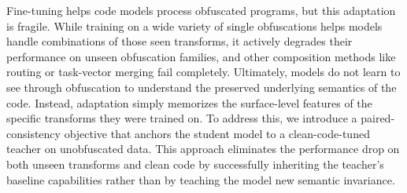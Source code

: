 Fine-tuning helps code models process obfuscated programs, but this adaptation is fragile. While training on a wide variety of single obfuscations helps models handle combinations of those seen transforms, it actively degrades their performance on unseen obfuscation families, and other composition methods like routing or task-vector merging fail completely. Ultimately, models do not learn to see through obfuscation to understand the preserved underlying semantics of the code. Instead, adaptation simply memorizes the surface-level features of the specific transforms they were trained on. To address this, we introduce a paired-consistency objective that anchors the student model to a clean-code-tuned teacher on unobfuscated data. This approach eliminates the performance drop on both unseen transforms and clean code by successfully inheriting the teacher's baseline capabilities rather than by teaching the model new semantic invariance.